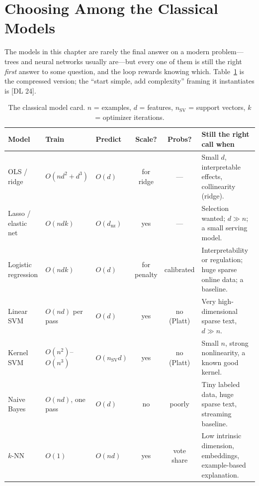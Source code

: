 \section{Choosing Among the Classical Models}
\label{cml:sec:classical_choice}

The models in this chapter are rarely the final answer on a modern problem---trees and neural networks usually are---but every one of them is still the right \emph{first} answer to some question, and the loop rewards knowing which. Table~\ref{cml:tab:model_card} is the compressed version; the ``start simple, add complexity'' framing it instantiates is [DL 24].

\begin{table}[H]
\centering\small
\caption{The classical model card. $n$ = examples, $d$ = features, $n_{\text{SV}}$ = support vectors, $k$ = optimizer iterations.}
\label{cml:tab:model_card}
\begin{tabularx}{\textwidth}{@{}l l l c c X@{}}
\toprule
\textbf{Model} & \textbf{Train} & \textbf{Predict} & \textbf{Scale?} & \textbf{Probs?} & \textbf{Still the right call when} \\
\midrule
OLS / ridge & $O(nd^2{+}d^3)$ & $O(d)$ & for ridge & --- & Small $d$, interpretable effects, collinearity (ridge). \\
Lasso / elastic net & $O(ndk)$ & $O(d_{\text{nz}})$ & yes & --- & Selection wanted; $d \gg n$; a small serving model. \\
Logistic regression & $O(ndk)$ & $O(d)$ & for penalty & calibrated & Interpretability or regulation; huge sparse online data; a baseline. \\
Linear SVM & $O(nd)$ per pass & $O(d)$ & yes & no (Platt) & Very high-dimensional sparse text, $d \gg n$. \\
Kernel SVM & $O(n^2)$--$O(n^3)$ & $O(n_{\text{SV}}d)$ & yes & no (Platt) & Small $n$, strong nonlinearity, a known good kernel. \\
Naive Bayes & $O(nd)$, one pass & $O(d)$ & no & poorly & Tiny labeled data, huge sparse text, streaming baseline. \\
$k$-NN & $O(1)$ & $O(nd)$ & yes & vote share & Low intrinsic dimension, embeddings, example-based explanation. \\
\bottomrule
\end{tabularx}
\end{table}

